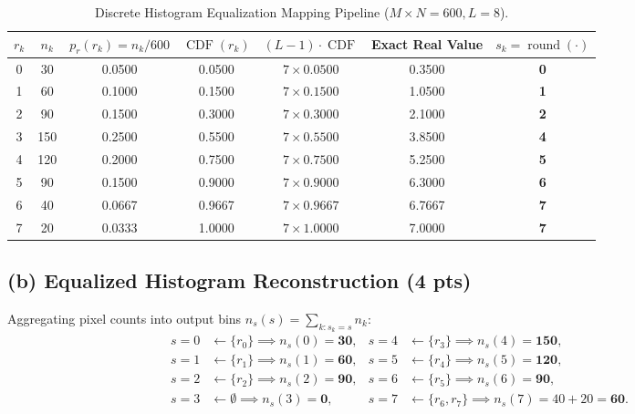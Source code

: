 \documentclass[11pt,a4paper]{article}
\begin{document}
\begin{table}[htbp]
\centering
\small
\caption{Discrete Histogram Equalization Mapping Pipeline ($M \times N = 600, L = 8$).}
\label{tab:p5_equalization}
\begin{tabular}{ccccccc}
\toprule
\textbf{$r_k$} & \textbf{$n_k$} & \textbf{$p_r(r_k) = n_k/600$} & \textbf{$\operatorname{CDF}(r_k)$} & \textbf{$(L-1) \cdot \operatorname{CDF}$} & \textbf{Exact Real Value} & \textbf{$s_k = \operatorname{round}(\cdot)$} \\
\midrule
0 & 30  & 0.0500 & 0.0500 & $7 \times 0.0500$ & 0.3500 & \textbf{0} \\
1 & 60  & 0.1000 & 0.1500 & $7 \times 0.1500$ & 1.0500 & \textbf{1} \\
2 & 90  & 0.1500 & 0.3000 & $7 \times 0.3000$ & 2.1000 & \textbf{2} \\
3 & 150 & 0.2500 & 0.5500 & $7 \times 0.5500$ & 3.8500 & \textbf{4} \\
4 & 120 & 0.2000 & 0.7500 & $7 \times 0.7500$ & 5.2500 & \textbf{5} \\
5 & 90  & 0.1500 & 0.9000 & $7 \times 0.9000$ & 6.3000 & \textbf{6} \\
6 & 40  & 0.0667 & 0.9667 & $7 \times 0.9667$ & 6.7667 & \textbf{7} \\
7 & 20  & 0.0333 & 1.0000 & $7 \times 1.0000$ & 7.0000 & \textbf{7} \\
\bottomrule
\end{tabular}
\end{table}

\subsection{(b) Equalized Histogram Reconstruction (4 pts)}
Aggregating pixel counts into output bins $n_s(s) = \sum_{k : s_k = s} n_k$:
\begin{align*}
s = 0 &\longleftarrow \{r_0\} \implies n_s(0) = \mathbf{30}, & s = 4 &\longleftarrow \{r_3\} \implies n_s(4) = \mathbf{150}, \\
s = 1 &\longleftarrow \{r_1\} \implies n_s(1) = \mathbf{60}, & s = 5 &\longleftarrow \{r_4\} \implies n_s(5) = \mathbf{120}, \\
s = 2 &\longleftarrow \{r_2\} \implies n_s(2) = \mathbf{90}, & s = 6 &\longleftarrow \{r_5\} \implies n_s(6) = \mathbf{90}, \\
s = 3 &\longleftarrow \emptyset \implies n_s(3) = \mathbf{0}, & s = 7 &\longleftarrow \{r_6, r_7\} \implies n_s(7) = 40 + 20 = \mathbf{60}.
\end{align*}
\end{document}
